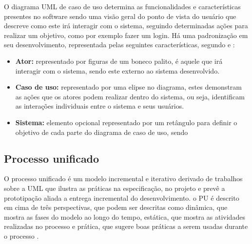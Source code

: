O diagrama UML de caso de uso determina as funcionalidades e características presentes no software sendo uma visão geral do ponto de vista do usuário que descreve como este irá interagir com o sistema, seguindo determinadas ações para realizar um objetivo, como por exemplo fazer um login. Há uma padronização em seu desenvolvimento, representada pelas seguintes características, segundo  e :
\begin{itemize}
    \item \textbf{Ator: }representado por figuras de um boneco palito, é aquele que irá interagir com o sistema, sendo este externo ao sistema desenvolvido.
    \item \textbf{Caso de uso: }representado por uma elipse no diagrama, estes demonstram as ações que os atores podem realizar dentro do sistema, ou seja, identificam as interações individuais entre o sistema e seus usuários. 
    \item \textbf{Sistema: }elemento opcional representado por um retângulo para definir o objetivo de cada parte do diagrama de caso de uso, sendo 
\end{itemize}

\subsection{Processo unificado}
O processo unificado é um modelo incremental e iterativo derivado de trabalhos sobre a UML que ilustra as práticas na especificação, no projeto e prevê a prototipação aliada a entrega incremental do desenvolvimento. o PU é descrito em cima de três perspectivas, que podem ser descritas como dinâmica, que mostra as fases do modelo ao longo do tempo, estática, que mostra as atividades realizadas no processo e prática, que sugere boas práticas a serem usadas durante o processo \cite{SOMMERVILE}.

